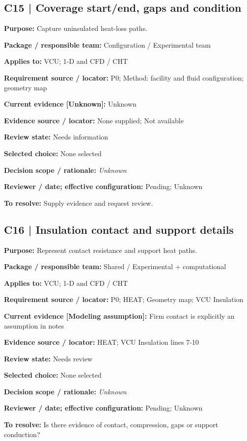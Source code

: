 \documentclass[11pt]{article}
\begin{document}
\par\noindent\begin{minipage}{\textwidth}\small\setlength{\parskip}{2pt}
\subsection*{C15 | Coverage start/end, gaps and condition}
\textbf{Purpose:} Capture uninsulated heat-loss paths.\par
\textbf{Package / responsible team:} Configuration / Experimental team\par
\textbf{Applies to:} VCU; 1-D and CFD / CHT\par
\textbf{Requirement source / locator:} P0; Method: facility and fluid configuration; geometry map\par
\textbf{Current evidence [Unknown]:} Unknown\par
\textbf{Evidence source / locator:} None supplied; Not available\par
\textbf{Review state:} Needs information\par
\textbf{Selected choice:} None selected\par
\textbf{Decision scope / rationale:} \textit{Unknown}\par
\textbf{Reviewer / date; effective configuration:} Pending; Unknown\par
\textbf{To resolve:} Supply evidence and request review.\par
\end{minipage}\par\vspace{5pt}
\par\noindent\begin{minipage}{\textwidth}\small\setlength{\parskip}{2pt}
\subsection*{C16 | Insulation contact and support details}
\textbf{Purpose:} Represent contact resistance and support heat paths.\par
\textbf{Package / responsible team:} Shared / Experimental + computational\par
\textbf{Applies to:} VCU; 1-D and CFD / CHT\par
\textbf{Requirement source / locator:} P0; HEAT; Geometry map; VCU Insulation\par
\textbf{Current evidence [Modeling assumption]:} Firm contact is explicitly an assumption in notes\par
\textbf{Evidence source / locator:} HEAT; VCU Insulation lines 7-10\par
\textbf{Review state:} Needs review\par
\textbf{Selected choice:} None selected\par
\textbf{Decision scope / rationale:} \textit{Unknown}\par
\textbf{Reviewer / date; effective configuration:} Pending; Unknown\par
\textbf{To resolve:} Is there evidence of contact, compression, gaps or support conduction?\par
\end{minipage}\par\vspace{5pt}
\end{document}
